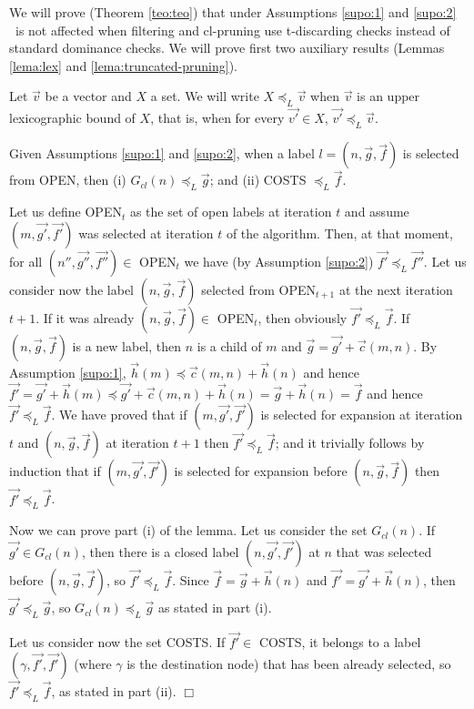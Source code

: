 
We  will prove (Theorem \ref{teo:teo}) that under Assumptions \ref{supo:1} and \ref{supo:2}
\namoate \ is not affected when filtering and cl-pruning use t-discarding checks instead of standard dominance checks.
We will prove first two auxiliary results (Lemmas \ref{lema:lex} and \ref{lema:truncated-pruning}).

Let $\vec v$ be a vector and $X$ a set. We will write $X\preceq_L \vec v$ when $\vec v$ is an upper lexicographic bound of $X$, that is, when
for every $\vec{v'}\in X$, $\vec{v'}\preceq_L \vec v$.  

\begin{lema}\label{lema:lex}
Given Assumptions \ref{supo:1} and \ref{supo:2}, when a label $l = (n,\vec g,\vec f)$ is selected from OPEN, then (i) $G_{cl}(n) \preceq_L \vec g$; and (ii) COSTS $\preceq_L \vec f$.
\end{lema}

\begin{demo}
Let us define OPEN$_t$ as the set of open labels at iteration $t$ and assume $(m,\vec{g'},\vec{f'})$ was selected at iteration $t$ of the algorithm. 
Then, at that moment, for all $(n'',\vec{g''},\vec{f''}) \in $ OPEN$_t$
we have (by Assumption \ref{supo:2}) $\vec{f'}\preceq_L \vec{f''}$.
Let us consider now the label $(n, \vec g, \vec f)$ selected from OPEN$_{t+1}$ at the next iteration $t+1$.
If it was already $(n, \vec g, \vec f) \in $ OPEN$_t$, then obviously $\vec{f'} \preceq_L \vec f$.
If $(n, \vec g, \vec f)$ is a new label, then $n$ is a child of $m$ and $\vec g = \vec{g'} + \vec c(m,n)$.
By Assumption  \ref{supo:1}, $\vec h(m) \preceq \vec c(m,n) + \vec h(n)$ and hence
$\vec{f'} = \vec{g'} + \vec h(m) \preceq \vec{g'} + \vec c(m,n) + \vec h(n) = \vec g + \vec h(n) = \vec f$ 
and hence $\vec{f'} \preceq_L \vec f$. We have proved that 
if $(m,\vec{g'},\vec{f'})$ is selected for expansion at iteration $t$ and $(n, \vec g, \vec f)$ at iteration $t+1$ then $\vec{f'}\preceq_L \vec f$; and 
it trivially follows by induction that if $(m,\vec{g'},\vec{f'})$ is selected for expansion before $(n, \vec g, \vec f)$ then $\vec{f'}\preceq_L \vec f$.

Now we can prove part (i) of the lemma. Let us consider the set $G_{cl}(n)$. 
If $\vec{g'}\in G_{cl}(n)$, then there is a closed label $(n,\vec{g'},\vec{f'})$ at $n$ that was selected before $(n,\vec g,\vec f)$, so $\vec{f'}\preceq_L \vec f$. Since $\vec f = \vec g + \vec h(n)$ and $\vec{f'} = \vec{g'} + \vec h(n)$, then $\vec{g'}\preceq_L \vec g$, so $G_{cl}(n)\preceq_L \vec g$ as stated in part (i).

Let us consider now the set COSTS. If $\vec{f'}\in$ COSTS, it belongs to a label
$(\gamma, \vec{f'},\vec{f'})$ (where $\gamma$ is the destination node) that has been already selected, so $\vec{f'}\preceq_L \vec f$, as stated in part (ii).  $\Box$
\end{demo}

